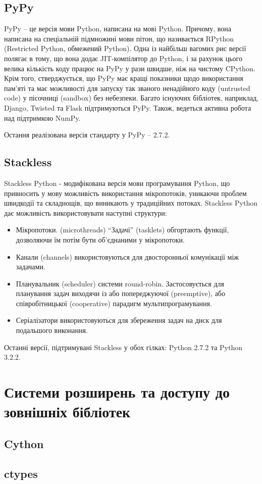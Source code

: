 \documentclass[a4paper, 12pt, onsedie]{article}
\begin{document}
\subsection{PyPy}
PyPy -- це версія мови Python, написана на мові Python. Причому, вона написана на спеціальній 
підмножині мови пітон, що називається RPython (Restricted Python, обмежений Python). Одна 
із найбільш вагомих рис версії полягає в тому, що вона додає JIT-компілятор до Python, і за 
рахунок цього велика кількість коду працює на PyPy у рази швидше, ніж на чистому CPython. 
Крім того, стверджується, що PyPy має кращі показники щодо використання пам'яті та має 
можливості для запуску так званого ненадійного коду (untrusted code) у пісочниці (sandbox) 
без небезпеки. Багато існуючих бібліотек, наприклад, Django, Twisted та Flask підтримуються 
PyPy. Також, ведеться активна робота над підтримкою NumPy.

Остання реалізована версія стандарту у PyPy -- 2.7.2.

\subsection{Stackless}
Stackless Python - модифікована версія мови програмування Python, що привносить у мову
можливість використання мікропотоків, уникаючи проблем швидкодії та складнощів, що виникають
у традиційних потоках. Stackless Python дає можливість використовувати наступні структури:
\begin{itemize}
    \item Мікропотоки. (microthreads) ``Задачі'' (tasklets) обгортають функції, дозволяючи їм 
          потім бути об'єднаними у мікропотоки.
    \item Канали (channels) використовуються для двосторонньої комунікації між задачами.
    \item Планувальник (scheduler) системи round-robin. Застосовується для планування
          задач виходячи із або попереджуючої (preemptive), або співробітницької (cooperative) 
          парадигм мультипрограмування.
    \item Серіалізатори використовуються для збереження задач на диск для подальшого виконання.
\end{itemize}

Останні версії, підтримувані Stackless у обох гілках: Python 2.7.2 та Python 3.2.2.

\section{Системи розширень та доступу до зовнішніх бібліотек}

\subsection{Cython}

\subsection{ctypes}
\end{document}
